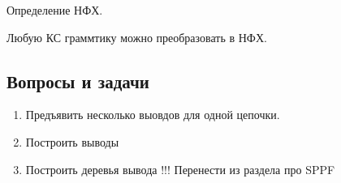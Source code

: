 \begin{definition}
Определение НФХ.
\end{definition}

\begin{theorem}
Любую КС граммтику можно преобразовать в НФХ.
\end{theorem}


\subsection{Вопросы и задачи}
\begin{enumerate}
  \item Предъявить несколько выовдов для одной цепочки.
  \item Построить выводы
  \item Построить деревья вывода !!! Перенести из раздела про SPPF
\end{enumerate}
